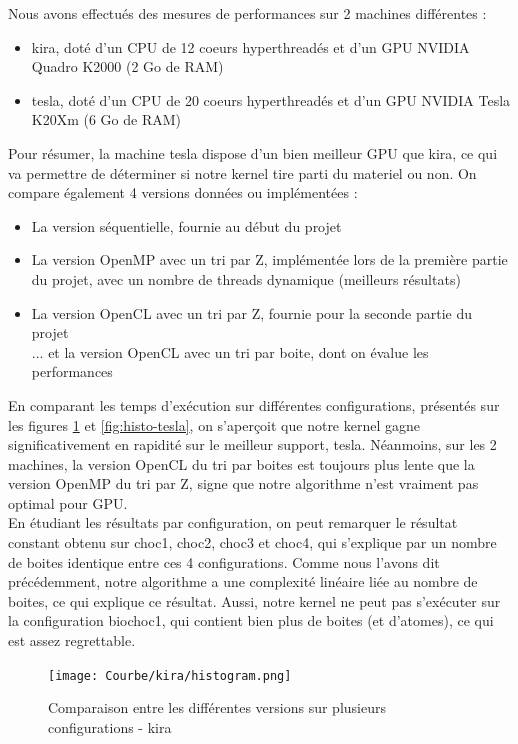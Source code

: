 \documentclass[]{article}
\begin{document}
Nous avons effectués des mesures de performances sur 2 machines différentes : 
\begin{itemize}
\item kira, doté d'un CPU de 12 coeurs hyperthreadés et d'un GPU NVIDIA Quadro K2000 (2 Go de RAM)
\item tesla, doté d'un CPU de 20 coeurs hyperthreadés et d'un GPU NVIDIA Tesla K20Xm (6 Go de RAM) \\
\end{itemize}
Pour résumer, la machine tesla dispose d'un bien meilleur GPU que kira, ce qui va permettre de déterminer si notre kernel tire parti du materiel ou non. 
On compare également 4 versions données ou implémentées :
\begin{itemize}
\item La version séquentielle, fournie au début du projet
\item La version OpenMP avec un tri par Z, implémentée lors de la première partie du projet, avec un nombre de threads dynamique (meilleurs résultats)
\item La version OpenCL avec un tri par Z, fournie pour la seconde partie du projet \\
... et la version OpenCL avec un tri par boite, dont on évalue les performances \\
\end{itemize}

En comparant les temps d'exécution sur différentes configurations, présentés sur les figures \ref{fig:histo-kira} et \ref{fig:histo-tesla}, on s'aperçoit que notre kernel gagne significativement en rapidité sur le meilleur support, tesla. Néanmoins, sur les 2 machines, la version OpenCL du tri par boites est toujours plus lente que la version OpenMP du tri par Z, signe que notre algorithme n'est vraiment pas optimal pour GPU.\\

En étudiant les résultats par configuration, on peut remarquer le résultat constant obtenu sur choc1, choc2, choc3 et choc4, qui s'explique par un nombre de boites identique entre ces 4 configurations. Comme nous l'avons dit précédemment, notre algorithme a une complexité linéaire liée au nombre de boites, ce qui explique ce résultat. Aussi, notre kernel ne peut pas s'exécuter sur la configuration biochoc1, qui contient bien plus de boites (et d'atomes), ce qui est assez regrettable.\\

\begin{figure}[H]
  \centering
  \texttt{[image: Courbe/kira/histogram.png]} 
  \caption{Comparaison entre les différentes versions sur plusieurs configurations - kira}
  \label{fig:histo-kira}
\end{figure}
\end{document}
